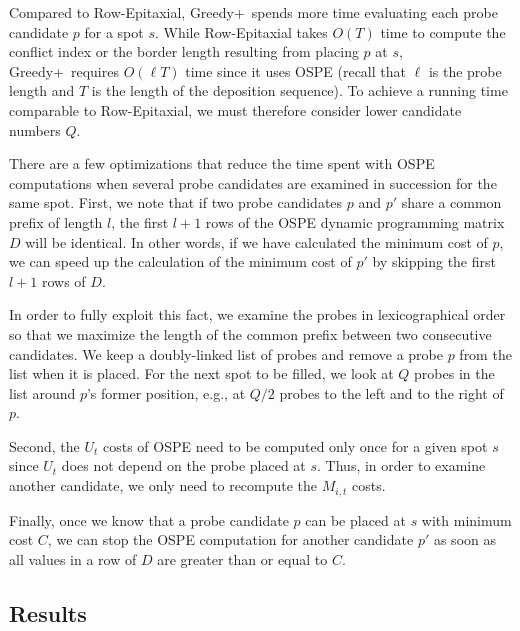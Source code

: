 \documentclass{w-edbk}
\newcommand{\Greedyplus}{Greedy+}
\begin{document}
Compared to Row-Epitaxial, \Greedyplus\ spends more time evaluating each probe
candidate $p$ for a spot $s$. While Row-Epitaxial takes $O(T)$ time to compute
the conflict index or the border length resulting from placing $p$ at $s$,
\Greedyplus\ requires $O(\ell T)$ time since it uses OSPE (recall that $\ell$
is the probe length and $T$ is the length of the deposition sequence). To
achieve a running time comparable to Row-Epitaxial, we must therefore consider
lower candidate numbers $Q$.

There are a few optimizations that reduce the time spent with OSPE
computations when several probe candidates are examined in succession
for the same spot. First, we note that if two probe candidates $p$ and
$p'$ share a common prefix of length $l$, the first $l + 1$ rows of
the OSPE dynamic programming matrix $D$ will be identical. In other
words, if we have calculated the minimum cost of $p$, we can speed up
the calculation of the minimum cost of $p'$ by skipping the first $l +
1$ rows of $D$.

In order to fully exploit this fact, we examine the probes in
lexicographical order so that we maximize the length of the common
prefix between two consecutive candidates. We keep a doubly-linked
list of probes and remove a probe $p$ from the list when it is placed.
For the next spot to be filled, we look at $Q$ probes in the list
around $p$'s former position, e.g., at $Q/2$ probes to the left and to
the right of $p$.

Second, the $U_t$ costs of OSPE need to be computed only once for a given spot
$s$ since $U_t$ does not depend on the probe placed at $s$. Thus, in order to
examine another candidate, we only need to recompute the $M_{i,t}$ costs.

Finally, once we know that a probe candidate $p$ can be placed at $s$
with minimum cost $C$, we can stop the OSPE computation for another
candidate $p'$ as soon as all values in a row of $D$ are greater than
or equal to $C$.


\subsection{Results}
\end{document}
